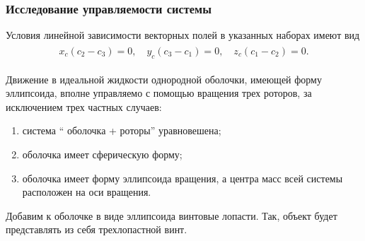 \begin{frame}
\frametitle{Исследование управляемости системы}

Условия линейной зависимости векторных полей в указанных наборах имеют вид
\begin{gather*}
\begin{gathered}
x_c(c_2 - c_3) = 0,\quad
y_c(c_3-c_1) = 0, \quad
z_c(c_1-c_2) = 0.
\end{gathered}
\end{gather*}

Движение в идеальной жидкости однородной оболочки, имеющей форму эллипсоида, вполне управляемо с помощью вращения трех роторов, за исключением трех частных случаев:
\begin{enumerate}
	\item система “ оболочка + роторы” уравновешена;
	\item оболочка имеет сферическую форму;
	\item оболочка имеет форму эллипсоида вращения, а центра масс всей системы	расположен на оси вращения.
\end{enumerate}

Добавим к оболочке в виде эллипсоида винтовые лопасти. Так, объект будет представлять из себя трехлопастной винт.

\end{frame}







%
%
%
%






